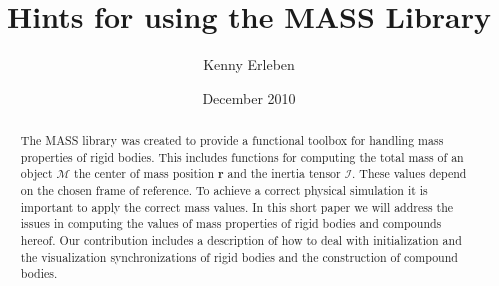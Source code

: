 \documentclass[twocolumn]{article}
\title{Hints for using the MASS Library}
\author{Kenny Erleben}
\date{December 2010}
\renewcommand{\vec}[1]{ \ensuremath{\mathbf{#1} } }
\newcommand{\inertia}{\ensuremath{\mathcal{I} }}
\newcommand{\mass}{\ensuremath{\mathcal{M} }}
\begin{document}
\maketitle

\begin{abstract}
  The MASS library was created to provide a functional toolbox for handling mass
  properties of rigid bodies. This includes functions for computing the total
  mass of an object $\mass$ the center of mass position $\vec r$ and the inertia
  tensor $\inertia$. These values depend on the chosen frame of reference. To
  achieve a correct physical simulation it is important to apply the correct
  mass values. In this short paper we will address the issues in computing the
  values of mass properties of rigid bodies and compounds hereof. Our
  contribution includes a description of how to deal with initialization and the
  visualization synchronizations of rigid bodies and the construction of
  compound bodies.
\end{abstract}
\end{document}
